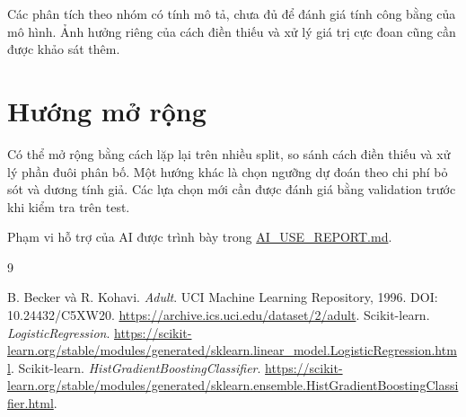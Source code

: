 \documentclass[12pt,a4paper]{report}
\begin{document}
Các phân tích theo nhóm có tính mô tả, chưa đủ để đánh giá tính công bằng của mô hình. Ảnh hưởng riêng của cách điền thiếu và xử lý giá trị cực đoan cũng cần được khảo sát thêm.

\section{Hướng mở rộng}
Có thể mở rộng bằng cách lặp lại trên nhiều split, so sánh cách điền thiếu và xử lý phần đuôi phân bố. Một hướng khác là chọn ngưỡng dự đoán theo chi phí bỏ sót và dương tính giả. Các lựa chọn mới cần được đánh giá bằng validation trước khi kiểm tra trên test.

Phạm vi hỗ trợ của AI được trình bày trong \href{https://github.com/dathuynh1108/CO5177-PFDAV/blob/main/AI\_USE\_REPORT.md}{AI\_USE\_REPORT.md}.
\begin{thebibliography}{9}
 B. Becker và R. Kohavi. \emph{Adult}. UCI Machine Learning Repository, 1996. DOI: 10.24432/C5XW20. \url{https://archive.ics.uci.edu/dataset/2/adult}.
 Scikit-learn. \emph{LogisticRegression}. \url{https://scikit-learn.org/stable/modules/generated/sklearn.linear_model.LogisticRegression.html}.
 Scikit-learn. \emph{HistGradientBoostingClassifier}. \url{https://scikit-learn.org/stable/modules/generated/sklearn.ensemble.HistGradientBoostingClassifier.html}.
\end{thebibliography}
\end{document}
